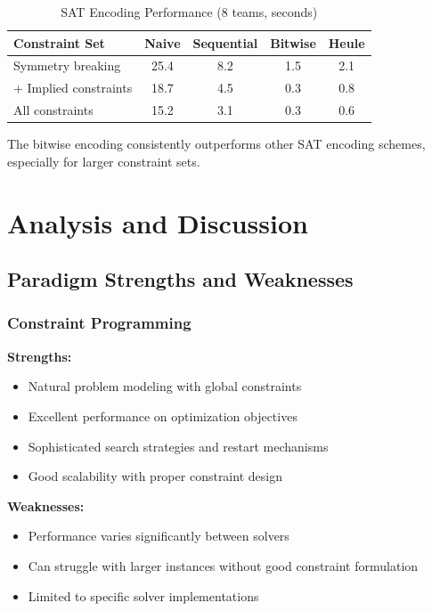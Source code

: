\documentclass[11pt]{article}
\begin{document}
\begin{itemize}
\begin{table}[H]
\centering
\caption{SAT Encoding Performance (8 teams, seconds)}
\label{tab:sat_encodings}
\begin{tabular}{@{}lcccc@{}}
\toprule
\textbf{Constraint Set} & \textbf{Naive} & \textbf{Sequential} & \textbf{Bitwise} & \textbf{Heule} \\
\midrule
Symmetry breaking       & 25.4 & 8.2  & 1.5  & 2.1  \\
+ Implied constraints   & 18.7 & 4.5  & 0.3  & 0.8  \\
All constraints         & 15.2 & 3.1  & 0.3  & 0.6  \\
\bottomrule
\end{tabular}
\end{table}

The bitwise encoding consistently outperforms other SAT encoding schemes, especially for larger constraint sets.

\section{Analysis and Discussion}

\subsection{Paradigm Strengths and Weaknesses}

\subsubsection{Constraint Programming}
\textbf{Strengths:}
\begin{itemize}
    \item Natural problem modeling with global constraints
    \item Excellent performance on optimization objectives
    \item Sophisticated search strategies and restart mechanisms
    \item Good scalability with proper constraint design
\end{itemize}

\textbf{Weaknesses:}
\begin{itemize}
    \item Performance varies significantly between solvers
    \item Can struggle with larger instances without good constraint formulation
    \item Limited to specific solver implementations
\end{itemize}


\end{itemize}
\end{document}
